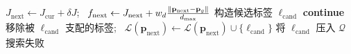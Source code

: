 \begin{algorithm}[htbp]
\begin{algorithmic}[1]
        \State $J_{\mathrm{next}} \leftarrow J_{\mathrm{cur}} + \delta J$; \ $f_{\mathrm{next}} \leftarrow J_{\mathrm{next}} + w_d\frac{\left\lVert\mathbf{p}_{\mathrm{next}}-\mathbf{p}_g\right\rVert}{d_{\max}}$
        \State 构造候选标签 $\ell_{\mathrm{cand}}$
            \State \textbf{continue}
        \EndIf
        \State 移除被 $\ell_{\mathrm{cand}}$ 支配的标签; \ $\mathcal{L}(\mathbf{p}_{\mathrm{next}}) \leftarrow \mathcal{L}(\mathbf{p}_{\mathrm{next}}) \cup \{\ell_{\mathrm{cand}}\}$
        \State 将 $\ell_{\mathrm{cand}}$ 压入 $\mathcal{Q}$
    \EndFor
\EndWhile
\State \Return 搜索失败
\end{algorithmic}
\end{algorithm}
